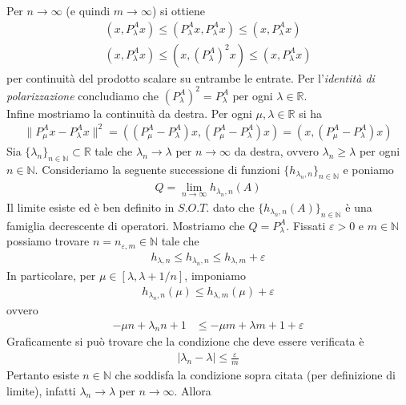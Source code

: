 \documentclass{article}
\numberwithin{equation}{subsection}
\begin{document}
Per $n \rightarrow \infty$ (e quindi $m \rightarrow \infty$) si ottiene 
\begin{align*}
    (x, P^A_\lambda x) \leq (P^A_\lambda x, P^A_\lambda x) \leq (x, P^A_\lambda x)  \\
    (x, P^A_\lambda x) \leq (x, (P^A_\lambda)^2x) \leq (x, P^A_\lambda x) 
\end{align*}
per continuità del prodotto scalare su entrambe le entrate. Per l'\textit{identità di polarizzazione} concludiamo che $(P^A_\lambda)^2 = P^A_\lambda$ per ogni $\lambda \in \mathbb{R}$. \\
Infine mostriamo la continuità da destra. Per ogni $\mu, \lambda \in \mathbb{R}$ si ha
\begin{align*}
    \|P^A_\mu x - P^A_\lambda x\|^2 = ((P^A_\mu - P^A_\lambda)x, (P^A_\mu - P^A_\lambda)x) = (x, (P^A_\mu - P^A_\lambda)x) 
\end{align*}
Sia $\{\lambda_n\}_{n \in \mathbb{N}} \subset \mathbb{R}$ tale che $\lambda_n \rightarrow \lambda$ per $n \rightarrow \infty$ da destra, ovvero $\lambda_n \geq \lambda$ per ogni $n \in \mathbb{N}$. Consideriamo la seguente successione di funzioni $\{h_{\lambda_n, n}\}_{n \in \mathbb{N}}$ e poniamo 
\begin{align*}
    Q = \lim_{n \rightarrow \infty} h_{\lambda_n, n}(A) 
\end{align*}
Il limite esiste ed è ben definito in $S.O.T.$ dato che $\{h_{\lambda_n, n}(A)\}_{n \in \mathbb{N}}$ è una famiglia decrescente di operatori. Mostriamo che $Q = P^A_\lambda$. Fissati $\varepsilon > 0$ e $m \in \mathbb{N}$ possiamo trovare $n = n_{\varepsilon, m} \in \mathbb{N}$ tale che 
\begin{align*}
    h_{\lambda, n} \leq h_{\lambda_n, n} \leq h_{\lambda, m} + \varepsilon 
\end{align*}
In particolare, per $\mu \in [\lambda, \lambda + 1/n]$, imponiamo 
\begin{align*}
    h_{\lambda_n, n}(\mu) \leq h_{\lambda, m}(\mu) + \varepsilon 
\end{align*}
ovvero 
\begin{align*}
    -\mu n + \lambda_n n + 1 &\leq -\mu m + \lambda m + 1 + \varepsilon 
\end{align*}
Graficamente si può trovare che la condizione che deve essere verificata è 
\begin{align*}
    |\lambda_n - \lambda| \leq \frac{\varepsilon}{m} 
\end{align*}
Pertanto esiste $n \in \mathbb{N}$ che soddisfa la condizione sopra citata (per definizione di limite), infatti $\lambda_n \rightarrow \lambda$ per $n \rightarrow \infty$. Allora 
\end{document}
